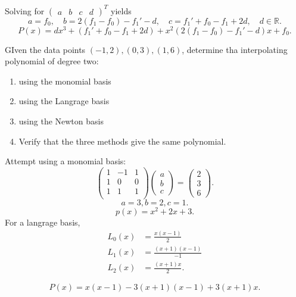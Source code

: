 \documentclass[5pt, a4paper]{article}
\begin{document}
Solving for $\begin{pmatrix} a & b & c & d \end{pmatrix}^T$ yields \[
a = f_0, \quad b = 2(f_1 - f_0) - f_1' - d, \quad  c = f_1' + f_0 - f_1 + 2d,
\quad d \in \mathbb{R}
.\] 
\[
P(x) = dx^3 + ( f_1' + f_0 - f_1 + 2d) + x^2 (2(f_1 - f_0) - f_1' - d) x + f_0
.\] 
\begin{tcolorbox}[title=Question 4]
    GIven the data points $(-1,2),(0,3),(1,6)$, determine tha interpolating
    polynomial of degree two:
     \begin{enumerate}
        \item using the monomial basis
        \item using the Langrage basis
        \item using the Newton basis
        \item Verify that the three methods give the same polynomial.
    \end{enumerate}
\end{tcolorbox}
Attempt using a monomial basis: 
\[
\begin{pmatrix} 
    1 & -1 & 1 \\ 
    1 & 0 & 0 \\ 
    1 & 1 & 1 \\
\end{pmatrix} 
\begin{pmatrix} a \\ b \\ c \end{pmatrix} 
= \begin{pmatrix} 2 \\ 3 \\ 6 \end{pmatrix} 
.\] 
\[
    a = 3, b = 2, c = 1
.\] 
\[
p(x) = x^2 + 2x + 3
.\] 
For a langrage basis, 
\begin{align*}
    L_0(x) &= \frac{x(x - 1)}{2} \\
    L_1(x) &=  \frac{(x+1)(x-1)}{-1}\\
    L_2(x) &= \frac{(x + 1)x}{2} 
.\end{align*}

\[
P(x) = x(x-1) - 3(x+1)(x-1) + 3(x+1)x
.\] 
\end{document}
